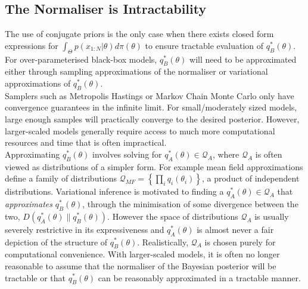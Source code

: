 \documentclass[twoside,11pt]{article}
\newcommand{\jk}[1]{{\color{blue} [JK: #1]}}
\begin{document}
\subsection{The Normaliser is Intractability}
The use of conjugate priors is the only case when there exists closed form expressions for $\int_{\Theta} p(x_{1:N}|\theta) d \pi(\theta)$ to ensure tractable evaluation of $q_B^*(\theta)$. For over-parameterised black-box models, $q_B^*(\theta)$ will need to be approximated either through sampling approximations of the normaliser or variational approximations of $q_B^*(\theta)$.
\newline
\\Samplers such as Metropolis Hastings or Markov Chain Monte Carlo only have convergence guarantees in the infinite limit. For small/moderately sized models, large enough samples will practically converge to the desired posterior. However, larger-scaled models generally require access to much more computational resources and time that is often impractical.  
\newline
\\Approximating $q_B^*(\theta)$ involves solving for $q_A^*(\theta) \in \mathcal{Q}_{A}$, where $\mathcal{Q}_{A}$ is often viewed as distributions of a simpler form. For example mean field approximations define a family of distributions $\mathcal{Q}_{MF} = \left\{\prod_i q_i(\theta_i)\right\}$, a product of independent distributions. Variational inference is motivated to finding a $q_A^*(\theta) \in \mathcal{Q}_{A}$ that \textit{approximates} $q_B^*(\theta)$, through the minimisation of some divergence between the two, $D(q_A^*(\theta)\| q_B^*(\theta))$. However the space of distributions $\mathcal{Q}_{A}$ is usually severely restrictive in its expressiveness and $q_A^*(\theta)$ is almost never a fair depiction of the structure of $q_B^*(\theta)$. Realistically, $\mathcal{Q}_{A}$ is chosen purely for computational convenience. With larger-scaled models, it is often no longer reasonable to assume that the normaliser of the Bayesian posterior will be tractable or that $q_B^*(\theta)$ can be reasonably approximated in a tractable manner.
\end{document}
